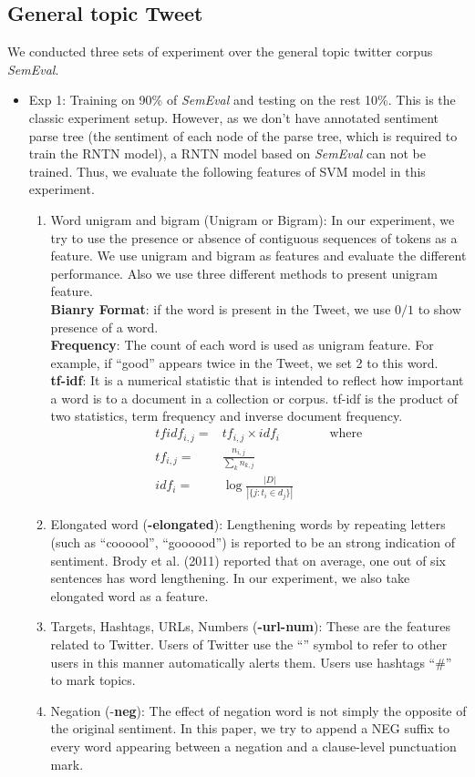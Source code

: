 \subsection{General topic Tweet}
We conducted three sets of experiment over the general topic twitter corpus \textit{SemEval}. 
\begin{itemize}
\item Exp 1: Training on 90\% of \textit{SemEval} and testing on the rest 10\%. 
This is the classic experiment setup. However, as we don't have annotated sentiment parse tree  (the sentiment of each node of the parse tree, which is required to train the RNTN model), a RNTN model based on \textit{SemEval} can not be trained. Thus, we evaluate the following features of SVM model in this experiment. 

\begin{enumerate}
\item Word unigram and bigram (Unigram or Bigram): In our experiment, we try to use the presence or absence of contiguous sequences of tokens as a feature. We use unigram and bigram as features and evaluate the different performance. Also we use three different methods to present unigram feature. \\
 \textbf{Bianry Format}: if the word is present in the Tweet, we use $0/1$ to show presence of a word.\\ 
 \textbf{Frequency}: The count of each word is used as unigram feature. For example, if “good” appears twice in the Tweet, we set 2 to this word.\\
 \textbf{tf-idf}: It is a numerical statistic that is intended to reflect how important a word is to a document in a collection or corpus. tf-idf is the product of two statistics, term frequency and inverse document frequency. 
  \begin{eqnarray*}
      tfidf_{i,j} = & tf_{i,j} \times idf_{i} & \qquad \text{where} \\
      tf_{i,j} = & \frac{n_{i,j}}{\sum_k n_{k,j}} & \\
      idf_i = & \log \frac{|D|}{|\{j: t_i \in d_j\}|} &
  \end{eqnarray*}   
  
  	\item Elongated word (\textbf{-elongated}): Lengthening words by repeating letters (such as “coooool”, “goooood”) is reported to be an strong indication of sentiment. Brody et al. (2011) reported that on average, one out of six sentences has word lengthening. In our experiment, we also take elongated word as a feature. 
   \item Targets, Hashtags, URLs, Numbers (\textbf{-url-num}): These are the features related to Twitter. Users of Twitter use the “\@” symbol to refer to other users in this manner automatically alerts them. Users use hashtags “\#” to mark topics. 
   \item Negation (-\textbf{neg}): The effect of negation word is not simply the opposite of the original sentiment. In this paper, we try to append a NEG suffix to every word appearing between a negation and a clause-level punctuation mark. 
  

\end{enumerate}
\end{itemize}
